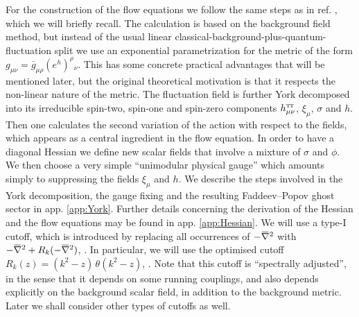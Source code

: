 \documentclass[11pt]{book} %
\newcommand{\overbar}[1]{\mkern 1.5mu\overline{\mkern-1.5mu#1\mkern-1.5mu}\mkern 1.5mu}
\newcommand\TTspace{ -1pt }
\newcommand\hTTmunu{ h^{\scriptscriptstyle{\mathrm{T\hspace{\TTspace}T}}}_{\mu\nu} }
\newcommand{\bnabla}{\overbar \nabla}
\numberwithin{equation}{chapter}
\begin{document}
For the construction of the flow equations we follow the same steps
as in ref. \cite{Percacci:2015wwa}, which we will briefly recall.
The calculation is based on the background field method,
but instead of the usual linear classical-background-plus-quantum-fluctuation split we
use an exponential parametrization for the metric of the form
$g_{\mu\nu} = \bar g_{\mu\rho}(e^h)^\rho{}_\nu$.
This has some concrete practical advantages that will be mentioned later,
but the original theoretical motivation is that it
respects the non-linear nature of the metric.
The fluctuation field is further York decomposed into its irreducible
spin-two, spin-one and spin-zero components $\hTTmunu$,
$\xi_\mu$, $\sigma$ and $h$.
Then one calculates the second variation of the action with
respect to the fields, which appears as a central ingredient
in the flow equation.
In order to have a diagonal Hessian we define new scalar fields
that involve a mixture of $\sigma$ and $\phi$.
We then choose a very simple ``unimodular physical gauge''
which amounts simply to suppressing the fields $\xi_\mu$ and $h$.
We describe the steps involved in the York decomposition, the
gauge fixing and the resulting Faddeev–Popov ghost sector in app. \ref{app:York}.
Further details concerning the derivation of the Hessian and the flow
equations may be found in app. \ref{app:Hessian}.
We will use a type-I cutoff, which is introduced by replacing
all occurrences of $-\bnabla^2$ with $-\bnabla^2+R_k(-\bnabla^2)$,
\cite{Codello:2008vh}.
In particular, we will use the optimised cutoff
$R_k(z)=\left( k^2-z \right) \, \theta \! \left( k^2-z \right)$, \cite{Litim:2001up}.
Note that this cutoff is ``spectrally adjusted'',
in the sense that it depends on some running couplings,
and also depends explicitly on the background scalar field,
in addition to the background metric.
Later we shall consider other types of cutoffs as well.
\end{document}
